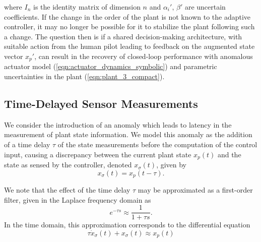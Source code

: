 where $I_n$ is the identity matrix of dimension $n$ and $\alpha_i', \, \beta'$ are uncertain coefficients. If the change in the order of the plant is not known to the adaptive controller, it may no longer be possible for it to stabilize the plant following such a change. The question then is if a shared decision-making architecture, with suitable action from the human pilot leading to feedback on the augmented state vector $x_p'$, can result in the recovery of closed-loop performance with anomalous actuator model (\ref{eqn:actuator_dynamics_symbolic}) and parametric uncertainties in the plant (\ref{eqn:plant_3_compact}).

\subsection{Time-Delayed Sensor Measurements} \label{subsec:siso_delay}
We consider the introduction of an anomaly which leads to latency in the measurement of plant state information. We model this anomaly as the addition of a time delay $\tau$ of the state measurements before the computation of the control input, causing a discrepancy between the current plant state $x_p(t)$ and the state as sensed by the controller, denoted $x_\sigma(t)$, given by
\begin{equation}
	x_\sigma(t) = x_p(t - \tau). \label{eqn:delay_diffeq}
\end{equation}

We note that the effect of the time delay $\tau$ may be approximated as a first-order filter, given in the Laplace frequency domain as
\begin{equation}
	e^{-\tau s} \approx \frac{1}{1 + \tau s}.
\end{equation}
In the time domain, this approximation corresponds to the differential equation
\begin{equation}
	\tau \dot{x}_{\sigma}(t) + x_{\sigma}(t) \approx x_p(t)	\label{eqn:delay_approx_diffeq}
\end{equation}

